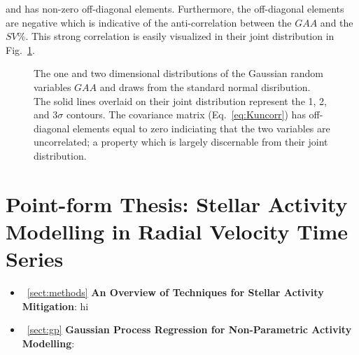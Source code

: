 \noindent and has non-zero off-diagonal elements. Furthermore, the off-diagonal
elements are negative which is indicative of the anti-correlation between the
$GAA$ and the $SV$\%. This strong correlation is easily visualized in their joint
distribution in Fig.~\ref{fig:corr2d}.

\begin{figure}
  \centering
  \caption{The one and two dimensional distributions of the Gaussian random
    variables $GAA$ and draws from the standard normal disribution. The solid
    lines overlaid on their joint distribution represent the 1, 2, and 3$\sigma$
    contours. The covariance matrix (Eq.~\ref{eq:Kuncorr})  has off-diagonal
    elements equal to zero indiciating that the two variables are uncorrelated;
    a property which is largely discernable from their joint distribution.}
  \label{fig:corr2d}
\end{figure}


\section{Point-form Thesis: Stellar Activity Modelling in Radial Velocity
  Time Series}
\begin{itemize}
\renewcommand\labelitemi{--}
\item~\ref{sect:methods} \textbf{An Overview of Techniques for Stellar Activity
Mitigation}: hi \\
\item~\ref{sect:gp} \textbf{Gaussian Process Regression for Non-Parametric
  Activity Modelling}:
\end{itemize}
